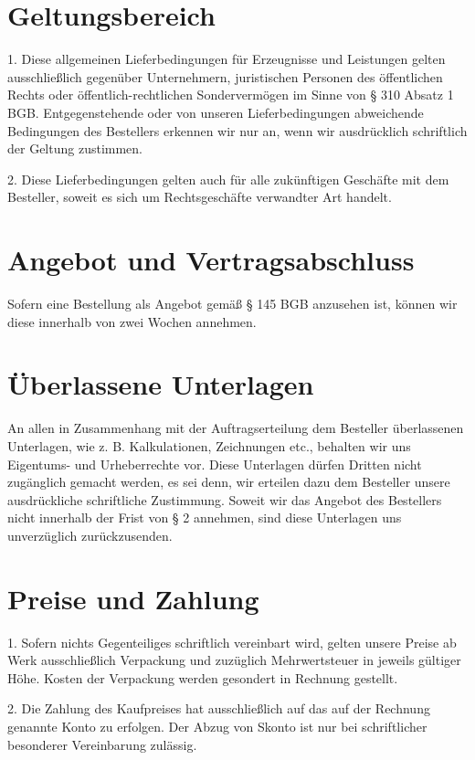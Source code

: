 \documentclass[a4paper, final, 11pt, oneside]{scrartcl}
\begin{document}
\begin{multicols}{2}
\section{Geltungsbereich}
1. Diese allgemeinen Lieferbedingungen für Erzeugnisse und Leistungen gelten ausschließlich gegenüber Unternehmern, juristischen Personen des öffentlichen Rechts oder öffentlich-rechtlichen Sondervermögen im Sinne von § 310 Absatz 1 BGB. Entgegenstehende oder von unseren Lieferbedingungen abweichende Bedingungen des Bestellers erkennen wir nur an, wenn wir ausdrücklich schriftlich der Geltung zustimmen.
  
2. Diese Lieferbedingungen gelten auch für alle zukünftigen Geschäfte mit dem Besteller, soweit es sich um Rechtsgeschäfte verwandter Art handelt.

\section{Angebot und Vertragsabschluss}
Sofern eine Bestellung als Angebot gemäß § 145 BGB anzusehen ist, können wir diese innerhalb von zwei Wochen annehmen.

\section{Überlassene Unterlagen}
An allen in Zusammenhang mit der Auftragserteilung dem Besteller überlassenen Unterlagen, wie z. B. Kalkulationen, Zeichnungen etc., behalten wir uns Eigentums- und Urheberrechte vor. Diese Unterlagen dürfen Dritten nicht
zugänglich gemacht werden, es sei denn, wir erteilen dazu dem Besteller unsere ausdrückliche schriftliche Zustimmung. Soweit wir das Angebot des Bestellers nicht innerhalb der Frist von § 2 annehmen, sind diese Unterlagen uns unverzüglich zurückzusenden.

\section{Preise und Zahlung}
1. Sofern nichts Gegenteiliges schriftlich vereinbart wird, gelten unsere Preise ab Werk ausschließlich Verpackung und zuzüglich Mehrwertsteuer in jeweils gültiger Höhe. Kosten der Verpackung werden gesondert in Rechnung gestellt.

2. Die Zahlung des Kaufpreises hat ausschließlich auf das auf der Rechnung genannte Konto zu erfolgen. Der Abzug von Skonto ist nur bei schriftlicher besonderer Vereinbarung zulässig.


\end{multicols}
\end{document}
